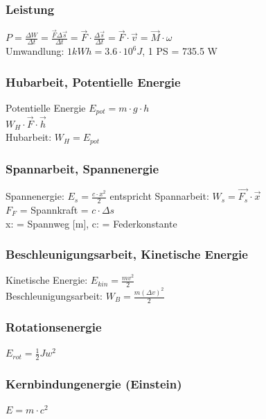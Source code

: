 \begin{multicols}{2}
\subsubsection{Leistung}

$P = \frac{\Delta W}{\Delta t} = \frac{\overrightarrow{F} \Delta \overrightarrow{s}}{ \Delta t} = \overrightarrow{F} \cdot \frac{\Delta \overrightarrow{s}}{\Delta t} = \overrightarrow{F} \cdot \overrightarrow{v} = \overrightarrow{M} \cdot \omega$ \\
Umwandlung:  $1 kWh = 3.6 \cdot 10^6 J $, 1 PS = 735.5 W


\subsubsection{Hubarbeit, Potentielle Energie}

Potentielle Energie $E_{pot} = m \cdot g \cdot h$ \\
$W_{H} \cdot \overrightarrow{F} \cdot \overrightarrow{h}$ \\
Hubarbeit: $W_{H} = E_{pot}$

\subsubsection{Spannarbeit, Spannenergie}
Spannenergie: $E_{s} = \frac{c \cdot x^2}{2}$  entspricht Spannarbeit: $W_{s} = \overrightarrow{F_{s}} \cdot \overrightarrow{x}$ \\
$F_{F}$ = Spannkraft = $c \cdot \Delta s$ \\
x: = Spannweg [m], c: = Federkonstante


\subsubsection{Beschleunigungsarbeit, Kinetische Energie}
Kinetische Energie: $E_{kin} = \frac{mv^2}{2}$ \\
Beschleunigungsarbeit: $W_{B} = \frac{m(\Delta v)^2}{2}$

\subsubsection{Rotationsenergie}
$E_{rot} = \frac{1}{2}Jw^2$ \\

\subsubsection{Kernbindungenergie (Einstein)}
$E = m \cdot c^2$ \\


\end{multicols}
